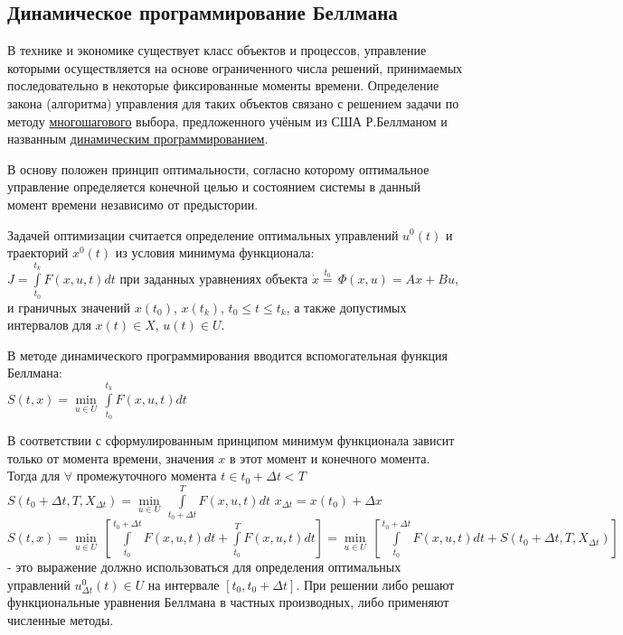 \documentclass[preprint,russian,a5paper,10pt,twoside,mediummath]{ncc}
\begin{document}
  \subsection{Динамическое программирование Беллмана\label{synthesis:dyn_prog}}
  \par В технике и экономике существует класс объектов и процессов, управление которыми осуществляется на основе ограниченного числа решений, принимаемых последовательно в некоторые фиксированные моменты времени. Определение закона (алгоритма) управления для таких объектов связано с решением задачи по методу \underline{многошагового} выбора, предложенного учёным из США Р.Беллманом и названным \underline{динамическим программированием}.
  \par В основу положен принцип оптимальности, согласно которому оптимальное управление определяется конечной целью и состоянием системы в данный момент времени независимо от предыстории.
  \par Задачей оптимизации считается определение оптимальных управлений ${{u}^{0}}\left( t \right)$ и траекторий ${{x}^{0}}\left( t \right)$ из условия минимума функционала:
\\$J=\int\limits_{{{t}_{0}}}^{{{t}_{k}}}{F\left( x,u,t \right)dt}$ при заданных уравнениях объекта $\dot{x}\overset{{{t}_{0}}}{\mathop{=}}\,\Phi \left( x,u \right)=Ax+Bu$, и граничных значений $x\left( {{t}_{0}} \right)$, $x\left( {{t}_{k}} \right)$, ${{t}_{0}}\le t\le {{t}_{k}}$, а также допустимых интервалов для $x\left( t \right)\in X$, $u\left( t \right)\in U$.
\par В методе динамического программирования вводится вспомогательная функция Беллмана:
\\$S\left( t,x \right)=\underset{u\in U}{\mathop{\min }}\,\int\limits_{{{t}_{0}}}^{{{t}_{k}}}{F\left( x,u,t \right)dt}$ 
\par В соответствии с сформулированным принципом минимум функционала зависит только от момента времени, значения $x$ в этот момент и конечного момента. Тогда для $\forall $ промежуточного момента $t\in {{t}_{0}}+\Delta t<T$ $S\left( {{t}_{0}}+\Delta t,T,{{X}_{\Delta t}} \right)=\underset{u\in U}{\mathop{\min }}\,\int\limits_{{{t}_{0}}+\Delta t}^{T}{F\left( x,u,t \right)dt}$ ${{x}_{\Delta t}}=x\left( {{t}_{0}} \right)+\Delta x$ $S\left( t,x \right)=\underset{u\in U}{\mathop{\min }}\,\left[ \int\limits_{{{t}_{0}}}^{{{t}_{0}}+\Delta t}{F\left( x,u,t \right)dt+\int\limits_{{{t}_{0}}}^{T}{F\left( x,u,t \right)dt}} \right]=\underset{u\in U}{\mathop{\min }}\,\left[ \int\limits_{{{t}_{0}}}^{{{t}_{0}}+\Delta t}{F\left( x,u,t \right)dt+S\left( {{t}_{0}}+\Delta t,T,{{X}_{\Delta t}} \right)} \right]$ - это выражение должно использоваться для определения оптимальных управлений $u_{\Delta t}^{0}\left( t \right)\in U$ на интервале $\left[ {{t}_{0}},{{t}_{0}}+\Delta t \right]$. При решении либо решают функциональные уравнения Беллмана в частных производных, либо применяют численные методы.
\end{document}
